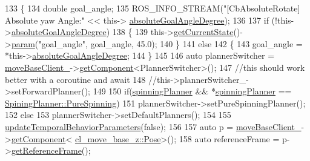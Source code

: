 \begin{DoxyCode}
133 \{
134     \textcolor{keywordtype}{double} goal\_angle;
135     ROS\_INFO\_STREAM(\textcolor{stringliteral}{"[CbAbsoluteRotate] Absolute yaw Angle:"} << this->
      \hyperlink{classcl__move__base__z_1_1CbAbsoluteRotate_ad5d0e21549940444e1cb525cda73329a}{absoluteGoalAngleDegree});
136 
137     \textcolor{keywordflow}{if} (!this->\hyperlink{classcl__move__base__z_1_1CbAbsoluteRotate_ad5d0e21549940444e1cb525cda73329a}{absoluteGoalAngleDegree})
138     \{
139         this->\hyperlink{classsmacc_1_1ISmaccClientBehavior_a34fde34e48fa13db622ee60d8374d0b8}{getCurrentState}()->\hyperlink{classsmacc_1_1ISmaccState_a4f2ff8e3eda8aa9bbb60c8ff17d0def1}{param}(\textcolor{stringliteral}{"goal\_angle"}, goal\_angle, 45.0);
140     \}
141     \textcolor{keywordflow}{else}
142     \{
143         goal\_angle = *this->\hyperlink{classcl__move__base__z_1_1CbAbsoluteRotate_ad5d0e21549940444e1cb525cda73329a}{absoluteGoalAngleDegree};
144     \}
145 
146     \textcolor{keyword}{auto} plannerSwitcher = \hyperlink{classcl__move__base__z_1_1CbMoveBaseClientBehaviorBase_ab2ef219464cfac8659b4a87c8d0db6d5}{moveBaseClient\_}->\hyperlink{classsmacc_1_1ISmaccClient_adef78db601749ca63c19e74a27cb88cc}{getComponent}<PlannerSwitcher>();
147     \textcolor{comment}{//this should work better with a coroutine and await}
148     \textcolor{comment}{//this->plannerSwitcher\_->setForwardPlanner();}
149     
150     \textcolor{keywordflow}{if}(\hyperlink{classcl__move__base__z_1_1CbAbsoluteRotate_a17d836524599af072cf2e3488e491a91}{spinningPlanner} && *\hyperlink{classcl__move__base__z_1_1CbAbsoluteRotate_a17d836524599af072cf2e3488e491a91}{spinningPlanner} == 
      \hyperlink{namespacecl__move__base__z_aab2ad3041275145f0065fb60b3299345aada5274435681a4ce04175bebfa6652f}{SpiningPlanner::PureSpinning})
151         plannerSwitcher->setPureSpinningPlanner();
152     \textcolor{keywordflow}{else}
153         plannerSwitcher->setDefaultPlanners();
154     
155     \hyperlink{classcl__move__base__z_1_1CbAbsoluteRotate_a2d8a4200dcacc00ad60c22ad2af5d4b2}{updateTemporalBehaviorParameters}(\textcolor{keyword}{false});
156 
157     \textcolor{keyword}{auto} p = \hyperlink{classcl__move__base__z_1_1CbMoveBaseClientBehaviorBase_ab2ef219464cfac8659b4a87c8d0db6d5}{moveBaseClient\_}->\hyperlink{classsmacc_1_1ISmaccClient_adef78db601749ca63c19e74a27cb88cc}{getComponent}<
      \hyperlink{classcl__move__base__z_1_1Pose}{cl\_move\_base\_z::Pose}>();
158     \textcolor{keyword}{auto} referenceFrame = p->\hyperlink{classcl__move__base__z_1_1Pose_af8c2dc151e74aa8da6b283d1c8563051}{getReferenceFrame}();

\end{DoxyCode}
